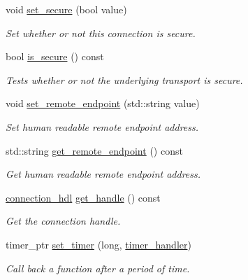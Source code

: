 \begin{DoxyCompactItemize}
void \hyperlink{classwebsocketpp_1_1transport_1_1iostream_1_1connection_a34443f9921e85115607304397d43cc8f}{set\+\_\+secure} (bool value)
\begin{DoxyCompactList}\small\item\em Set whether or not this connection is secure. \end{DoxyCompactList}\item 
bool \hyperlink{classwebsocketpp_1_1transport_1_1iostream_1_1connection_aae6fa1869211e9dc8a18d609292bd833}{is\+\_\+secure} () const
\begin{DoxyCompactList}\small\item\em Tests whether or not the underlying transport is secure. \end{DoxyCompactList}\item 
void \hyperlink{classwebsocketpp_1_1transport_1_1iostream_1_1connection_a846340a41ebbce1a6a1cecfd9026c2e9}{set\+\_\+remote\+\_\+endpoint} (std\+::string value)
\begin{DoxyCompactList}\small\item\em Set human readable remote endpoint address. \end{DoxyCompactList}\item 
std\+::string \hyperlink{classwebsocketpp_1_1transport_1_1iostream_1_1connection_ac1c63528e36a2a60c0efc01a1c17584e}{get\+\_\+remote\+\_\+endpoint} () const
\begin{DoxyCompactList}\small\item\em Get human readable remote endpoint address. \end{DoxyCompactList}\item 
\hyperlink{namespacewebsocketpp_a6b3d26a10ee7229b84b776786332631d}{connection\+\_\+hdl} \hyperlink{classwebsocketpp_1_1transport_1_1iostream_1_1connection_a06d23eee9c6c1bd1a48f7cf8a081bda9}{get\+\_\+handle} () const
\begin{DoxyCompactList}\small\item\em Get the connection handle. \end{DoxyCompactList}\item 
timer\+\_\+ptr \hyperlink{classwebsocketpp_1_1transport_1_1iostream_1_1connection_a7852f9c0dc64d6e51b57b4a28302a602}{set\+\_\+timer} (long, \hyperlink{namespacewebsocketpp_1_1transport_a946cc56ff41139f3002149c15fd87bc9}{timer\+\_\+handler})
\begin{DoxyCompactList}\small\item\em Call back a function after a period of time. \end{DoxyCompactList}\item 

\end{DoxyCompactItemize}
